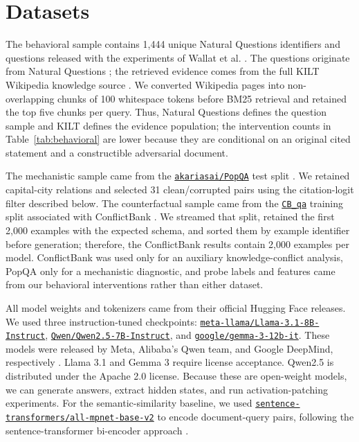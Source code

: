 \documentclass[a4paper,fleqn]{cas-sc}
\begin{document}
\section{Datasets}
\label{sec:datasets}

\color{blue}
The behavioral sample contains 1,444 unique Natural Questions identifiers and questions released with the experiments of Wallat et al. \cite{wallat2025correctness}. The questions originate from Natural Questions \cite{kwiatkowski2019natural}; the retrieved evidence comes from the full KILT Wikipedia knowledge source \cite{petroni2021kilt}. We converted Wikipedia pages into non-overlapping chunks of 100 whitespace tokens before BM25 retrieval and retained the top five chunks per query. Thus, Natural Questions defines the question sample and KILT defines the evidence population; the intervention counts in Table~\ref{tab:behavioral} are lower because they are conditional on an original cited statement and a constructible adversarial document.
\color{black}

The mechanistic sample came from the \href{https://huggingface.co/datasets/akariasai/PopQA}{\texttt{akariasai/PopQA}} test split \cite{mallen2023popqa}. We retained capital-city relations and selected 31 clean/corrupted pairs using the citation-logit filter described below. The counterfactual sample came from the \href{https://huggingface.co/datasets/Warrieryes/CB_qa}{\texttt{CB\_qa}} training split associated with ConflictBank \cite{su2024conflictbank}. We streamed that split, retained the first 2,000 examples with the expected schema, and sorted them by example identifier before generation; therefore, the ConflictBank results contain 2,000 examples per model. ConflictBank was used only for an auxiliary knowledge-conflict analysis, PopQA only for a mechanistic diagnostic, and probe labels and features came from our behavioral interventions rather than either dataset.

All model weights and tokenizers came from their official Hugging Face releases. We used three instruction-tuned checkpoints: \href{https://huggingface.co/meta-llama/Llama-3.1-8B-Instruct}{\texttt{meta-llama/Llama-3.1-8B-Instruct}}, \href{https://huggingface.co/Qwen/Qwen2.5-7B-Instruct}{\texttt{Qwen/Qwen2.5-7B-Instruct}}, and \href{https://huggingface.co/google/gemma-3-12b-it}{\texttt{google/gemma-3-12b-it}}. These models were released by Meta, Alibaba's Qwen team, and Google DeepMind, respectively \cite{grattafiori2024llama3,yang2024qwen25,gemmateam2025gemma3}. Llama 3.1 and Gemma 3 require license acceptance. Qwen2.5 is distributed under the Apache 2.0 license. Because these are open-weight models, we can generate answers, extract hidden states, and run activation-patching experiments. For the semantic-similarity baseline, we used \href{https://huggingface.co/sentence-transformers/all-mpnet-base-v2}{\texttt{sentence-transformers/all-mpnet-base-v2}} to encode document-query pairs, following the sentence-transformer bi-encoder approach \cite{reimers2019sentencebert}.
\end{document}
